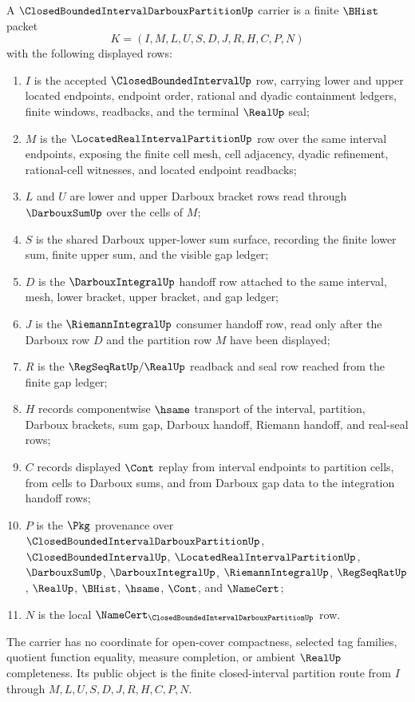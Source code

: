 \begin{definition}
\label{def:closed-bounded-interval-darboux-partition-carrier}
A $\ClosedBoundedIntervalDarbouxPartitionUp$ carrier is a finite $\BHist$ packet
$$
K=(I,M,L,U,S,D,J,R,H,C,P,N)
$$
with the following displayed rows:
\begin{enumerate}
\item $I$ is the accepted $\ClosedBoundedIntervalUp$ row, carrying lower and upper located endpoints, endpoint order, rational and dyadic containment ledgers, finite windows, readbacks, and the terminal $\RealUp$ seal;
\item $M$ is the $\LocatedRealIntervalPartitionUp$ row over the same interval endpoints, exposing the finite cell mesh, cell adjacency, dyadic refinement, rational-cell witnesses, and located endpoint readbacks;
\item $L$ and $U$ are lower and upper Darboux bracket rows read through $\DarbouxSumUp$ over the cells of $M$;
\item $S$ is the shared Darboux upper-lower sum surface, recording the finite lower sum, finite upper sum, and the visible gap ledger;
\item $D$ is the $\DarbouxIntegralUp$ handoff row attached to the same interval, mesh, lower bracket, upper bracket, and gap ledger;
\item $J$ is the $\RiemannIntegralUp$ consumer handoff row, read only after the Darboux row $D$ and the partition row $M$ have been displayed;
\item $R$ is the $\RegSeqRatUp/\RealUp$ readback and seal row reached from the finite gap ledger;
\item $H$ records componentwise $\hsame$ transport of the interval, partition, Darboux brackets, sum gap, Darboux handoff, Riemann handoff, and real-seal rows;
\item $C$ records displayed $\Cont$ replay from interval endpoints to partition cells, from cells to Darboux sums, and from Darboux gap data to the integration handoff rows;
\item $P$ is the $\Pkg$ provenance over $\ClosedBoundedIntervalDarbouxPartitionUp$, $\ClosedBoundedIntervalUp$, $\LocatedRealIntervalPartitionUp$, $\DarbouxSumUp$, $\DarbouxIntegralUp$, $\RiemannIntegralUp$, $\RegSeqRatUp$, $\RealUp$, $\BHist$, $\hsame$, $\Cont$, and $\NameCert$;
\item $N$ is the local $\NameCert_{\ClosedBoundedIntervalDarbouxPartitionUp}$ row.
\end{enumerate}
The carrier has no coordinate for open-cover compactness, selected tag families, quotient function equality, measure completion, or ambient $\RealUp$ completeness. Its public object is the finite closed-interval partition route from $I$ through $M,L,U,S,D,J,R,H,C,P,N$.
\end{definition}


